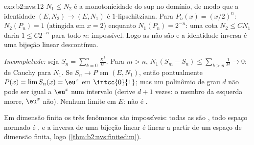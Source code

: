 \begin{solution}{exo:b2:nvs:12}
$N_1 \leq N_2$ é a monotonicidade do sup no domínio, de modo que a
identidade $(E, N_2) \to (E, N_1)$ é $1$-lipschitziana. Para $P_n(x) =
(x/2)^n$: $N_2(P_n) = 1$ (atingida em $x = 2$) enquanto $N_1(P_n) =
2^{-n}$: uma cota $N_2 \leq CN_1$ daria $1 \leq C2^{-n}$ para
todo $n$: impossível. Logo as  não são  e a
identidade inversa é uma bijeção linear descontínua.

\emph{Incompletude:} seja $S_n = \sum_{k=0}^{n}\frac{X^k}{k!}$.
Para $m > n$, $N_1(S_m - S_n) \leq \sum_{k>n}\frac1{k!} \to 0$:
de Cauchy para $N_1$. Se $S_n \to P$ em $(E, N_1)$, então pontualmente
$P(x) = \lim S_n(x) = \eu^x$ em $\intcc{0}{1}$; mas um polinômio
de grau $d$ não pode ser igual a $\eu^x$ num intervalo (derive
$d + 1$ vezes: o membro da esquerda morre, $\eu^x$ não). Nenhum limite em
$E$: não é .

Em dimensão finita os três fenômenos são impossíveis: todas as 
são , todo espaço normado é , e a inversa
de uma bijeção linear é linear a partir de um espaço de dimensão finita,
logo  (\cref{thm:b2:nvs:finitedim}).
\end{solution}

